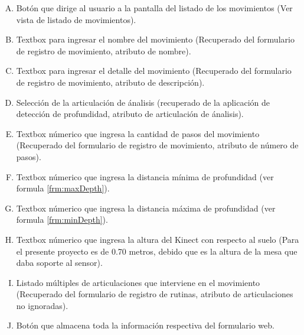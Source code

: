\begin{enumerate}[A.]
\item Bot\'on que dirige al usuario a la pantalla del listado de los movimientos (Ver vista de listado de movimientos).
\item Textbox para ingresar el nombre del movimiento (Recuperado del formulario de registro de movimiento, atributo de nombre).
\item Textbox para ingresar el detalle del movimiento (Recuperado del formulario de registro de movimiento, atributo de descripci\'on).
\item Selecci\'on de la articulaci\'on de \'analisis (recuperado de la aplicaci\'on de detecci\'on de profundidad, atributo de articulaci\'on de \'analisis).
\item Textbox n\'umerico que ingresa la cantidad de pasos del movimiento (Recuperado del formulario de registro de movimiento, atributo de n\'umero de pasos).
\item Textbox n\'umerico que ingresa la distancia m\'inima de profundidad (ver formula \ref{frm:maxDepth}).
\item Textbox n\'umerico que ingresa la distancia m\'axima de profundidad (ver formula \ref{frm:minDepth}).
\item Textbox n\'umerico que ingresa la altura del Kinect con respecto al suelo (Para el presente proyecto es de 0.70 metros, debido que es la altura de la mesa que daba soporte al sensor).
\item Listado m\'ultiples de articulaciones que interviene en el movimiento (Recuperado del formulario de registro de rutinas, atributo de articulaciones no ignoradas).
\item Bot\'on que almacena toda la informaci\'on respectiva del formulario web.
\end{enumerate}
